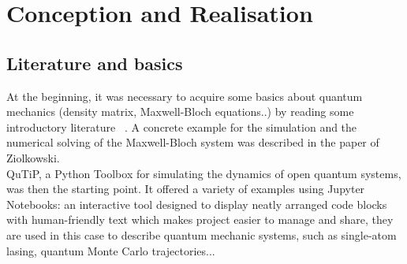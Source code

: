 \chapter{Conception and Realisation}
\label{chapter:conception}

\section{Literature and basics}
At the beginning, it was necessary to acquire some basics about quantum mechanics (density matrix, Maxwell-Bloch equations..) by reading some introductory literature ~\cite{bastard1992}. A concrete example for the simulation and the numerical solving of the Maxwell-Bloch system was described in the paper of Ziolkowski.\\
QuTiP, a Python Toolbox for simulating the dynamics of open quantum systems, was then the starting point. It offered a variety of examples using Jupyter Notebooks: an interactive tool designed to display neatly arranged code blocks with human-friendly text which makes project easier to manage and share, they are used in this case to describe quantum mechanic systems, such as single-atom lasing, quantum Monte Carlo trajectories...\\
